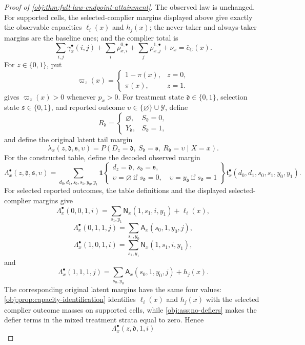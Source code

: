 \documentclass[11pt]{article}
\begin{document}
\begin{proof}[Proof of \cref{obj:thm:full-law-endpoint-attainment}]
The observed law is unchanged.  For supported cells, the selected-complier margins displayed above give exactly the observable capacities \(\ell_i(x)\) and \(h_j(x)\); the never-taker and always-taker margins are the baseline ones; and the complier total is
\[
\sum_{i,j}\gamma^\bullet_x(i,j)
+\sum_i\rho^{0,\bullet}_{x,i}
+\sum_j\rho^{1,\bullet}_{x,j}
+\nu_x
=
\bar c_C(x).
\]
For \(z\in\{0,1\}\), put
\[
\varpi_z(x)=
\begin{cases}
1-\pi(x),& z=0,\\
\pi(x),& z=1.
\end{cases}
\]
 gives \(\varpi_z(x)>0\) whenever \(p_x>0\).  For treatment state \(\mathfrak d\in\{0,1\}\), selection state \(\mathfrak s\in\{0,1\}\), and reported outcome \(\upsilon\in\{\varnothing\}\cup\mathcal Y\), define
\[
R_{\mathfrak d}
=
\begin{cases}
\varnothing,& S_{\mathfrak d}=0,\\
Y_{\mathfrak d},& S_{\mathfrak d}=1,
\end{cases}
\]
and define the original latent tail margin
\[
\lambda_x(z,\mathfrak d,\mathfrak s,\upsilon)
=
P\!\left(D_z=\mathfrak d,\ S_{\mathfrak d}=\mathfrak s,\ R_{\mathfrak d}=\upsilon\mid X=x\right).
\]
For the constructed table, define the decoded observed margin
\[
\Lambda^\bullet_x(z,\mathfrak d,\mathfrak s,\upsilon)
=
\sum_{d_0,d_1,s_0,s_1,y_0,y_1}
\mathbf 1\!
\left\{
\begin{array}{c}
 d_z=\mathfrak d,\ s_{\mathfrak d}=\mathfrak s,\\
 \upsilon=\varnothing\ \text{if }s_{\mathfrak d}=0,\quad
 \upsilon=y_{\mathfrak d}\ \text{if }s_{\mathfrak d}=1
\end{array}
\right\}
\mathfrak t^\bullet_x(d_0,d_1,s_0,s_1,y_0,y_1).
\]
For selected reported outcomes, the table definitions and the displayed selected-complier margins give
\[
\Lambda^\bullet_x(0,0,1,i)
=
\sum_{s_1,y_1}\mathsf N_x(1,s_1,i,y_1)+\ell_i(x),
\]
\[
\Lambda^\bullet_x(0,1,1,j)
=
\sum_{s_0,y_0}\mathsf A_x(s_0,1,y_0,j),
\]
\[
\Lambda^\bullet_x(1,0,1,i)
=
\sum_{s_1,y_1}\mathsf N_x(1,s_1,i,y_1),
\]
and
\[
\Lambda^\bullet_x(1,1,1,j)
=
\sum_{s_0,y_0}\mathsf A_x(s_0,1,y_0,j)+h_j(x).
\]
The corresponding original latent margins have the same four values: \cref{obj:prop:capacity-identification} identifies \(\ell_i(x)\) and \(h_j(x)\) with the selected complier outcome masses on supported cells, while \cref{obj:ass:no-defiers} makes the defier terms in the mixed treatment strata equal to zero.  Hence
\[
\Lambda^\bullet_x(z,\mathfrak d,1,i)
\]
\end{proof}
\end{document}
